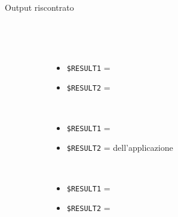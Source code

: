 \documentclass[../../SperimentazioniPratiche.tex]{subfiles}
\begin{document}
\begin{tcolorbox}[fonttitle=\bfseries, 
								adjusted title={\Large Prova 1C.2}, 
								breakable, 
								sharp corners=south,
								colback=white, 
								colframe=white!60!black]
\begin{description}
        			\item[Output riscontrato] \ \par
        				\begin{description}
        				
        					\item[\dispositivoA] \ \par
        					\begin{itemize}
        						\item \verb|$RESULT1| = \ok
        						\item \verb|$RESULT2| = \ok
        					\end{itemize}      					
        					
        					\item[\dispositivoB] \ \par
        					\begin{itemize}
        						\item \verb|$RESULT1| = \ok
        						\item \verb|$RESULT2| = \ok dell'applicazione
        					\end{itemize}
        					
        					\item[\dispositivoC] \ \par
        					\begin{itemize}
        						\item \verb|$RESULT1| = \ok
        						\item \verb|$RESULT2| = \ok
        					\end{itemize}
        					
        				\end{description}
        				
				\end{description}  
				
			\end{tcolorbox}

	\newpage
\end{document}
